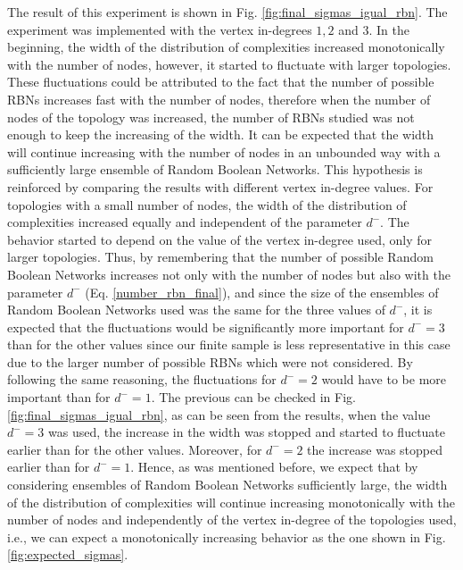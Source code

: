 
The result of this experiment is shown in Fig. \ref{fig:final_sigmas_igual_rbn}. The experiment was implemented with the vertex in-degrees $1,2$ and $3$. In the beginning, the width of the distribution of complexities increased monotonically with the number of nodes, however, it started to fluctuate with larger topologies. These fluctuations could be attributed to the fact that the number of possible RBNs increases fast with the number of nodes, therefore when the number of nodes of the topology was increased, the number of RBNs studied was not enough to keep the increasing of the width. It can be expected that the width will continue increasing with the number of nodes in an unbounded way with a sufficiently large ensemble of Random Boolean Networks. This hypothesis is reinforced by comparing the results with different vertex in-degree values. For topologies with a small number of nodes, the width of the distribution of complexities increased equally and independent of the parameter $d^{-}$. The behavior started to depend on the value of the vertex in-degree used, only for larger topologies. Thus, by remembering that the number of possible Random Boolean Networks increases not only with the number of nodes but also with the parameter $d^{-}$ (Eq. \ref{number_rbn_final}), and since the size of the ensembles of Random Boolean Networks used was the same for the three values of $d^{-}$, it is expected that the fluctuations would be significantly more important for $d^{-}=3$ than for the other values since our finite sample is less representative in this case due to the larger number of possible RBNs which were not considered. By following the same reasoning, the fluctuations for $d^{-}=2$ would have to be more important than for $d^{-}=1$. The previous can be checked in Fig. \ref{fig:final_sigmas_igual_rbn}, as can be seen from the results, when the value $d^{-}=3$ was used, the increase in the width was stopped and started to fluctuate earlier than for the other values. Moreover, for $d^{-}=2$ the increase was stopped earlier than for $d^{-}=1$. Hence, as was mentioned before, we expect that by considering ensembles of Random Boolean Networks sufficiently large, the width of the distribution of complexities will continue increasing monotonically with the number of nodes and independently of the vertex in-degree of the topologies used, i.e., we can expect a monotonically increasing behavior as the one shown in Fig. \ref{fig:expected_sigmas}.\\

